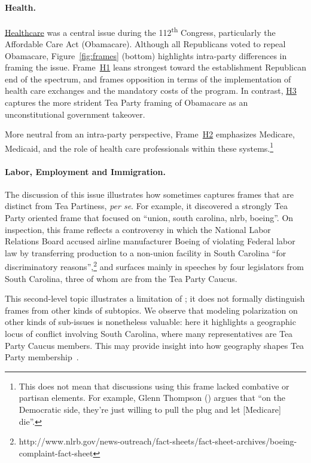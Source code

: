 \paragraph{Health.}

\underline{Healthcare} was a central issue during the 112\textsuperscript{th}
Congress, particularly the Affordable Care Act (Obamacare). Although all
Republicans voted to repeal Obamacare, Figure~\ref{fig:frames} (bottom) highlights
intra-party differences in framing the issue. Frame~\underline{H1} leans strongest toward
the establishment Republican end of the spectrum, and frames opposition in terms of
the implementation of health care exchanges and the mandatory costs of the
program. In contrast, \underline{H3} captures the more strident Tea Party framing of Obamacare as an unconstitutional government takeover.

More neutral from an intra-party perspective,
Frame~\underline{H2} emphasizes Medicare, Medicaid, and the role of health
care professionals within these systems.\footnote{This does not mean that discussions using this frame
  lacked combative or partisan elements. For example, Glenn Thompson
  () argues that  ``on the
  Democratic side, they're just willing to pull the plug and let
  [Medicare] die''. }


\paragraph{Labor, Employment and Immigration.}

The discussion of this issue illustrates how \name{} sometimes captures frames that are distinct from Tea Partiness, \emph{per se}.  For
example, it discovered a strongly Tea Party oriented frame that focused on ``union,
south carolina, nlrb, boeing''. On inspection, this frame reflects a controversy in which the National
Labor Relations Board accused airline manufacturer Boeing of violating
Federal labor law by transferring production to a non-union facility
in South Carolina ``for discriminatory
reasons'',\footnote{http://www.nlrb.gov/news-outreach/fact-sheets/fact-sheet-archives/boeing-complaint-fact-sheet}
and surfaces mainly in speeches by four legislators from South Carolina, three of whom are from the Tea Party Caucus.


This second-level topic illustrates a limitation of \name{}; it does not formally
distinguish frames from other kinds of subtopics. We observe that modeling polarization on
other kinds of sub-issues is nonetheless valuable: here it highlights
a geographic locus of conflict involving South Carolina, where many
representatives are Tea Party Caucus members. This may provide insight
into how geography shapes Tea Party
membership~\cite{GervaisPSP12:tealeaves}.

